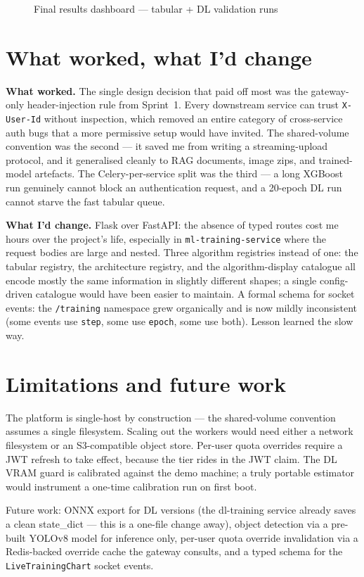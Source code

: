 \documentclass[12pt, a4paper]{report}
\newcommand{\figph}[2]{%
    \begin{figure}[h]
        \centering
        \fbox{\parbox{0.85\linewidth}{\centering \textbf{PLACEHOLDER:} #1}}
        \caption{#2}
    \end{figure}%
}
\begin{document}
\figph{Final results dashboard}{Final results dashboard --- tabular + DL validation runs}

\section*{What worked, what I'd change}

\textbf{What worked.} The single design decision that paid off
most was the gateway-only header-injection rule from Sprint~1.
Every downstream service can trust \texttt{X-User-Id} without
inspection, which removed an entire category of cross-service auth
bugs that a more permissive setup would have invited. The
shared-volume convention was the second --- it saved me from
writing a streaming-upload protocol, and it generalised cleanly to
RAG documents, image zips, and trained-model artefacts. The
Celery-per-service split was the third --- a long XGBoost run
genuinely cannot block an authentication request, and a 20-epoch
DL run cannot starve the fast tabular queue.

\textbf{What I'd change.} Flask over FastAPI: the absence of typed
routes cost me hours over the project's life, especially in
\texttt{ml-training-service} where the request bodies are large
and nested. Three algorithm registries instead of one: the tabular
registry, the architecture registry, and the algorithm-display
catalogue all encode mostly the same information in slightly
different shapes; a single config-driven catalogue would have been
easier to maintain. A formal schema for socket events: the
\texttt{/training} namespace grew organically and is now mildly
inconsistent (some events use \texttt{step}, some use
\texttt{epoch}, some use both). Lesson learned the slow way.

\section*{Limitations and future work}

The platform is single-host by construction --- the shared-volume
convention assumes a single filesystem. Scaling out the workers
would need either a network filesystem or an S3-compatible object
store. Per-user quota overrides require a JWT refresh to take
effect, because the tier rides in the JWT claim. The DL VRAM
guard is calibrated against the demo machine; a truly portable
estimator would instrument a one-time calibration run on first
boot.

Future work: ONNX export for DL versions (the dl-training service
already saves a clean state\_dict --- this is a one-file change
away), object detection via a pre-built YOLOv8 model for inference
only, per-user quota override invalidation via a Redis-backed
override cache the gateway consults, and a typed schema for the
\texttt{LiveTrainingChart} socket events.
\end{document}
